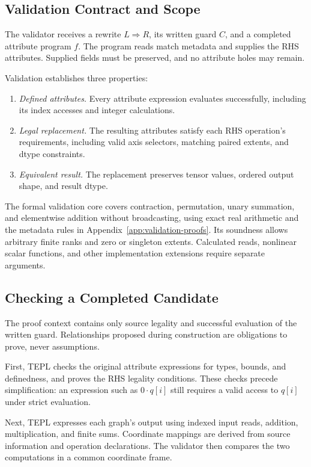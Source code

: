 \subsection{Validation Contract and Scope}
\label{sec:validation-boundary}
The validator receives a rewrite $L\Rightarrow R$, its written guard
$C$, and a completed attribute program $f$. The program reads match
metadata and supplies the RHS attributes. Supplied fields must be
preserved, and no attribute holes may remain.

Validation establishes three properties:
\begin{enumerate}
\item \emph{Defined attributes.}
Every attribute expression evaluates successfully, including its
index accesses and integer calculations.
\item \emph{Legal replacement.}
The resulting attributes satisfy each RHS operation's requirements,
including valid axis selectors, matching paired extents, and dtype
constraints.
\item \emph{Equivalent result.}
The replacement preserves tensor values, ordered output shape, and
result dtype.
\end{enumerate}

The formal validation core covers contraction, permutation, unary
summation, and elementwise addition without broadcasting, using exact
real arithmetic and the metadata rules in
Appendix~\ref{app:validation-proofs}. Its soundness allows arbitrary
finite ranks and zero or singleton extents. Calculated reads,
nonlinear scalar functions, and other implementation extensions
require separate arguments.

\subsection{Checking a Completed Candidate}
\label{sec:validation-algorithm}
The proof context contains only source legality and successful
evaluation of the written guard. Relationships proposed during
construction are obligations to prove, never assumptions.

First, TEPL checks the original attribute expressions for types,
bounds, and definedness, and proves the RHS legality conditions.
These checks precede simplification: an expression such as
$0\cdot q[i]$ still requires a valid access to $q[i]$ under strict
evaluation.

Next, TEPL expresses each graph's output using indexed input reads,
addition, multiplication, and finite sums. Coordinate mappings are
derived from source information and operation declarations. The
validator then compares the two computations in a common coordinate
frame.

